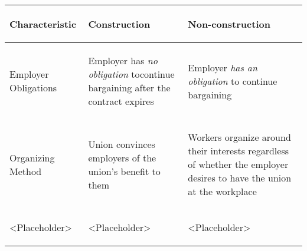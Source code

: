 \documentclass[12pt]{article}
\begin{document}
\begin{landscape}

\begin{tabular}{|p{1.25in}|p{3in}|p{3in}|}
\hline

\begin{center} \textbf{Characteristic} \end{center} & %
\begin{center}\textbf{Construction}\end{center} &	%
\begin{center}\textbf{Non-construction}\end{center} \\ %
\hline

\begin{center}Employer Obligations\end{center} & %
\begin{center}\begin{flushleft}Employer has \textit{no obligation} tocontinue bargaining after the contract expires\end{flushleft}\end{center} &	%
\begin{center}\begin{flushleft}Employer \textit{has an obligation} to continue bargaining\end{flushleft}\end{center} \\ %
\hline

\begin{center}Organizing Method\end{center} &	%
\begin{center}\begin{flushleft}Union convinces employers of the union's benefit to them\end{flushleft}\end{center} &	%
\begin{center}\begin{flushleft}Workers organize around their interests regardless of whether the employer desires to have the union at the workplace\end{flushleft}\end{center} \\ %
\hline

\begin{center}<Placeholder>\end{center} &	%
\begin{center}\begin{flushleft}<Placeholder>\end{flushleft}\end{center} &	%
\begin{center}\begin{flushleft}<Placeholder>\end{flushleft}\end{center} \\ %
\hline


\end{tabular}
\end{landscape}
\end{document}
